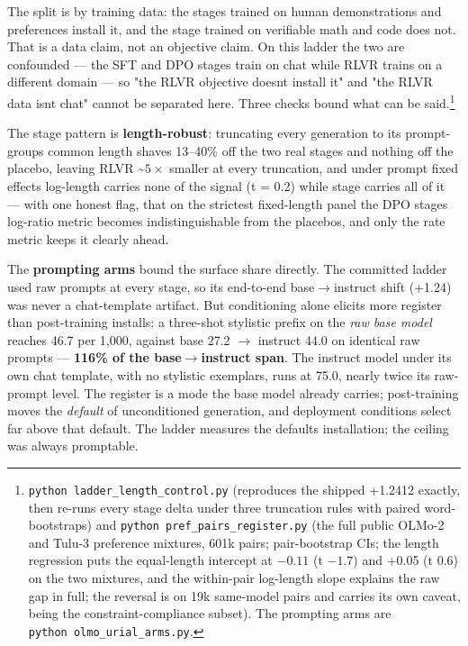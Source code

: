 The split is by training data: the stages trained on human demonstrations and
preferences install it, and the stage trained on verifiable math and code does
not. That is a data claim, not an objective claim. On this ladder the two are
confounded --- the SFT and DPO stages train on chat while RLVR trains on a
different domain --- so "the RLVR objective doesn\textquotesingle t install it" and "the RLVR
data isn\textquotesingle t chat" cannot be separated here. Three checks bound what can be
said.\footnote{\texttt{python\ ladder\_\allowbreak{}length\_\allowbreak{}control.\allowbreak{}py} (reproduces the shipped
  +1.2412 exactly, then re-runs every stage delta under three truncation
  rules with paired word-bootstraps) and \texttt{python\ pref\_\allowbreak{}pairs\_\allowbreak{}register.\allowbreak{}py}
  (the full public OLMo-2 and Tulu-3 preference mixtures, 601k pairs;
  pair-bootstrap CIs; the length regression puts the equal-length
  intercept at \(-0.11\) (t \(-1.7\)) and +0.05 (t 0.6) on the two mixtures, and
  the within-pair log-length slope explains the raw gap in full; the
  reversal is on 19k same-model pairs and carries its own caveat, being
  the constraint-compliance subset). The prompting arms are
  \texttt{python\ olmo\_\allowbreak{}urial\_\allowbreak{}arms.\allowbreak{}py}.}

The stage pattern is \textbf{length-robust}: truncating
every generation to its prompt-group\textquotesingle s common length shaves 13--40\% off the
two real stages and nothing off the placebo, leaving RLVR \textasciitilde\(5\times\) smaller at
every truncation, and under prompt fixed effects log-length carries none
of the signal (t = 0.2) while stage carries all of it --- with one honest
flag, that on the strictest fixed-length panel the DPO stage\textquotesingle s log-ratio
metric becomes indistinguishable from the placebo\textquotesingle s, and only the rate
metric keeps it clearly ahead.

The \textbf{prompting arms} bound the surface share directly. The committed ladder
used raw prompts at every stage, so its end-to-end base\(\rightarrow\)instruct shift (+1.24)
was never a chat-template artifact. But conditioning alone elicits more
register than post-training installs: a three-shot stylistic prefix on the
\emph{raw base model} reaches 46.7 per 1,000, against base 27.2 \(\rightarrow\) instruct 44.0 on
identical raw prompts --- \textbf{116\% of the base\(\rightarrow\)instruct span}. The instruct model
under its own chat template, with no stylistic exemplars, runs at 75.0, nearly
twice its raw-prompt level. The register is a mode the base model already
carries; post-training moves the \emph{default} of unconditioned generation, and
deployment conditions select far above that default. The ladder measures the
default\textquotesingle s installation; the ceiling was always promptable.

